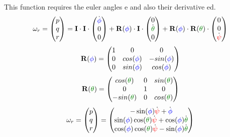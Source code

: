 This function requires the euler angles e and also their derivative ed.\\
\begin{equation}
\ra{r} = \begin{pmatrix} p\\q\\r \end{pmatrix} = 
\eye \multiplication \eye \multiplication\begin{pmatrix} \dot{\Roll}\\0\\0 \end{pmatrix} + 
\mat R(\Roll)\multiplication \eye \multiplication\begin{pmatrix} 0\\\dot{\Pitch}\\0 \end{pmatrix} + 
\mat R(\Roll)\multiplication \mat R(\Pitch)\multiplication \begin{pmatrix} 0\\0\\\dot{\Yaw} \end{pmatrix}
\end{equation}
\begin{equation}
\mat R(\Roll) = \begin{pmatrix}
1 & 0         &     0      \\
0 & cos(\Roll) & -sin(\Roll) \\
0 & sin(\Roll) &  cos(\Roll) 
\end{pmatrix}
\end{equation}
\begin{equation}
\mat R(\Pitch) = \begin{pmatrix}
 cos(\Pitch) & 0 & sin(\Pitch) \\
 0         & 1 &     0     \\
-sin(\Pitch) & 0 & cos(\Pitch) 
\end{pmatrix}
\end{equation}
\begin{equation}
\ra r = \begin{pmatrix} p\\q\\r \end{pmatrix} = 
\begin{pmatrix}
- \sin (\Roll) \dot{\Yaw} + \dot{\Roll} \\
\sin (\Roll) \cos (\Pitch) \dot{\Yaw} + \cos (\Roll) \dot{\Pitch} \\
\cos (\Roll) \cos (\Pitch) \dot{\Yaw} - \sin (\Roll) \dot{\Pitch} \\
\end{pmatrix}
\end{equation}

